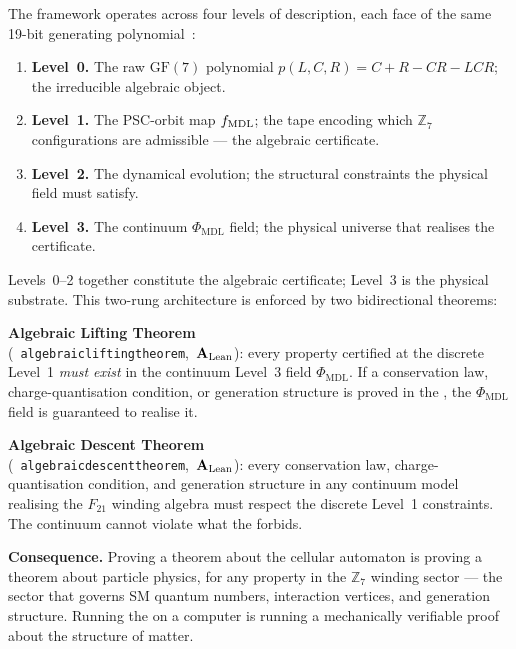 \documentclass[11pt]{article}
\newcommand{\CMCA}{\text{CMCA}}
\newcommand{\PHIMDL}{\ensuremath{\Phi_{\mathrm{MDL}}}}
\newcommand{\ZS}{\ensuremath{\mathbb{Z}_7}}
\newcommand{\GF}[1]{\ensuremath{\mathrm{GF}(#1)}}
\newcommand{\lean}[1]{%
  \penalty-100
  \begingroup\def\_{\textunderscore\allowbreak}\texttt{#1}\endgroup}
\newcommand{\CatAL}{\ensuremath{\textbf{A}_{\rm Lean}}}
\begin{document}
The framework operates across four levels of description, each face of the same
19-bit generating polynomial~\cite{SpivackGTECompleteFramework}:
\begin{enumerate}[leftmargin=1.8em,itemsep=1pt]
\item \textbf{Level~0.}  The raw $\GF{7}$ polynomial $p(L,C,R) = C+R-CR-LCR$; the
  irreducible algebraic object.
\item \textbf{Level~1.}  The PSC-orbit map $f_{\rm MDL}$; the \CMCA{} tape encoding
  which $\ZS$ configurations are admissible --- the algebraic certificate.
\item \textbf{Level~2.}  The \CMCA{} dynamical evolution; the structural constraints
  the physical field must satisfy.
\item \textbf{Level~3.}  The continuum $\PHIMDL$ field; the physical universe that
  realises the certificate.
\end{enumerate}
Levels~0--2 together constitute the algebraic certificate; Level~3 is the physical
substrate.  This two-rung architecture is enforced by two bidirectional theorems:

\begin{tcolorbox}[colback=blue!4,colframe=blue!50!black,
  title={The Lifting/Descent Bridge: Why CA Theorems Are Physics Theorems},
  fonttitle=\bfseries,breakable=false]
\small
\textbf{Algebraic Lifting Theorem}\\
\mbox{(\lean{algebraic\_lifting\_theorem}, \CatAL)}:
every property certified at the discrete Level~1 \emph{must exist} in the continuum
Level~3 field $\PHIMDL$.  If a conservation law, charge-quantisation condition, or
generation structure is proved in the \CMCA{}, the $\PHIMDL$ field is guaranteed to
realise it.

\smallskip
\textbf{Algebraic Descent Theorem}\\
\mbox{(\lean{algebraic\_descent\_theorem}, \CatAL)}:
every conservation law, charge-quantisation condition, and generation structure in
any continuum model realising the $F_{21}$ winding algebra must respect the discrete
Level~1 constraints.  The continuum cannot violate what the \CMCA{} forbids.

\smallskip\noindent
\textbf{Consequence.}  Proving a theorem about the cellular automaton is proving a
theorem about particle physics, for any property in the $\ZS$ winding sector --- the
sector that governs SM quantum numbers, interaction vertices, and generation
structure.  Running the \CMCA{} on a computer is running a mechanically verifiable
proof about the structure of matter.
\end{tcolorbox}
\end{document}
